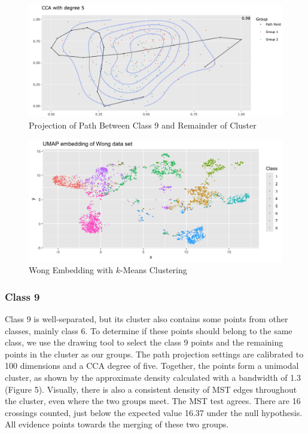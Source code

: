 \documentclass{article}
\begin{document}
{\renewcommand{\figurename}{Figure}
\renewcommand{\thefigure}{5}
\begin{figure}[!t]
\centering
\includegraphics[scale=0.36]{class 9 projection MNIST}
\caption{Projection of Path Between Class 9 and Remainder of Cluster}
\end{figure}

\renewcommand{\figurename}{Figure}
\renewcommand{\thefigure}{6}
\begin{figure}[!b]
\centering
\includegraphics[scale=0.43]{Wong kmeans}
\caption{Wong Embedding with $k$-Means Clustering}
\end{figure}

\subsubsection{Class 9}
Class 9 is well-separated, but its cluster also contains some points from other classes, mainly class 6. To determine if these points should belong to the same class, we use the drawing tool to select the class 9 points and the remaining points in the cluster as our groups. The path projection settings are calibrated to 100 dimensions and a CCA degree of five. Together, the points form a unimodal cluster, as shown by the approximate density calculated with a bandwidth of 1.3 (Figure 5). Visually, there is also a consistent density of MST edges throughout the cluster, even where the two groups meet. The MST test agrees. There are 16 crossings counted, just below the expected value 16.37 under the null hypothesis. All evidence points towards the merging of these two groups.

}
\end{document}
